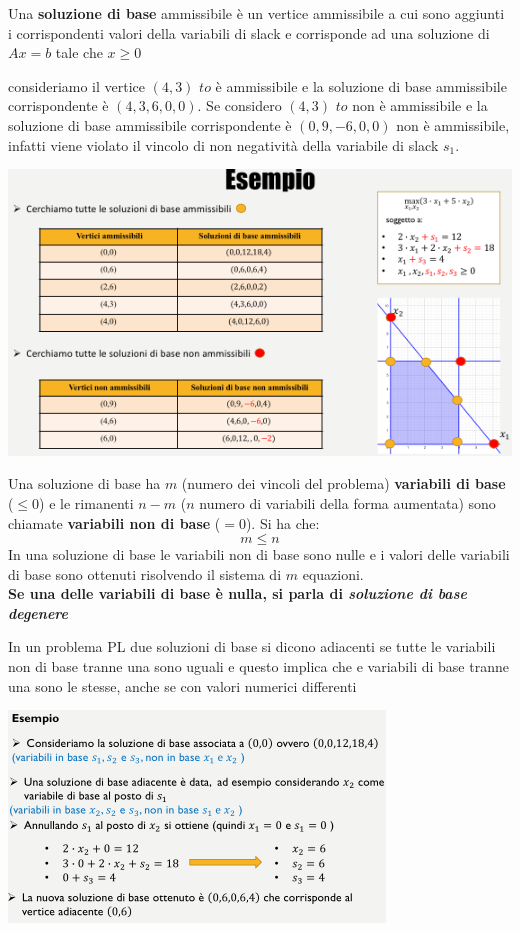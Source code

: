 \message{ !name(ro.tex)}\documentclass[a4paper,12pt, oneside]{book}
\begin{document}
\begin{definizione}
  Una \textbf{soluzione di base} ammissibile è un vertice ammissibile a
  cui sono aggiunti i corrispondenti valori della variabili di slack e
  corrisponde ad una soluzione di $Ax=b$ tale che $x\geq 0$
\end{definizione}
\begin{esempio}
  consideriamo il vertice $(4,3)$ $to$ è ammissibile e la soluzione di base
  ammissibile corrispondente è $(4, 3, 6, 0, 0)$. Se considero $(4,3)$
  $to$ non è ammissibile e la soluzione di base ammissibile corrispondente
  è $(0,9,-6,0,0)$ non è ammissibile, infatti viene violato il vincolo
  di non negatività della variabile di slack $s_1$.\\
  \begin{center}
    \includegraphics[scale = 1]{img/simp21.png}
  \end{center}
\end{esempio}
Una soluzione di base ha $m$ (numero dei vincoli del problema)
\textbf{variabili di base} ($\leq 0$) e le rimanenti $n − m$ ($n$ numero di
variabili della forma aumentata) sono chiamate \textbf{variabili
  non di base} ($=0$). Si ha che:
\[m\leq n\]
In una soluzione di base le variabili non di base sono nulle e i valori delle
variabili di base sono ottenuti risolvendo il sistema di $m$
equazioni.\\
\textbf{Se una delle variabili di base è nulla, si parla di 
  \textit{ soluzione di base degenere}}
\begin{definizione}
  In un problema PL due soluzioni di base si dicono adiacenti se tutte
  le variabili non di base tranne una sono uguali e questo implica che
  e variabili di base tranne una sono le stesse, anche se con 
  valori numerici differenti
\end{definizione}
\begin{center}
  \includegraphics[scale = 1]{img/simp22.png}
\end{center}
\end{document}
